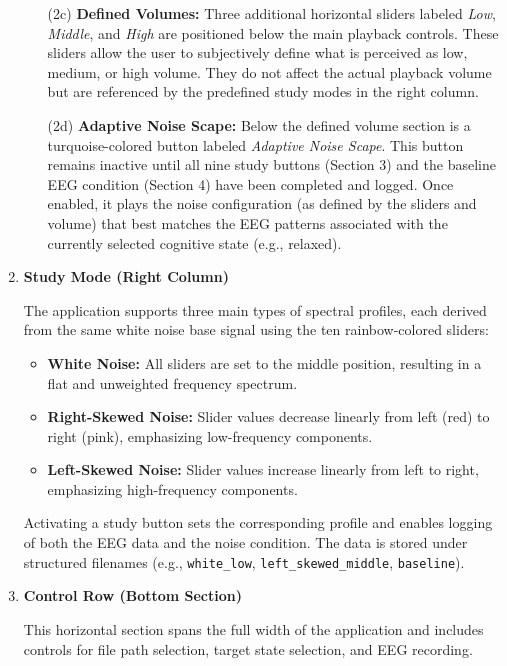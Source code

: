 \begin{enumerate}
\begin{enumerate}
  \item[(2c)] \textbf{Defined Volumes:} Three additional horizontal sliders labeled \textit{Low}, \textit{Middle}, and \textit{High} are positioned below the main playback controls. These sliders allow the user to subjectively define what is perceived as low, medium, or high volume. They do not affect the actual playback volume but are referenced by the predefined study modes in the right column.

  \item[(2d)] \textbf{Adaptive Noise Scape:} Below the defined volume section is a turquoise-colored button labeled \textit{Adaptive Noise Scape}. This button remains inactive until all nine study buttons (Section 3) and the baseline EEG condition (Section 4) have been completed and logged. Once enabled, it plays the noise configuration (as defined by the sliders and volume) that best matches the EEG patterns associated with the currently selected cognitive state (e.g., relaxed). \\
\end{enumerate}

\item \textbf{Study Mode (Right Column)}

The application supports three main types of spectral profiles, each derived from the same white noise base signal using the ten rainbow-colored sliders:

\begin{itemize}
\item \textbf{White Noise:} All sliders are set to the middle position, resulting in a flat and unweighted frequency spectrum.
\item \textbf{Right-Skewed Noise:} Slider values decrease linearly from left (red) to right (pink), emphasizing low-frequency components.
\item \textbf{Left-Skewed Noise:} Slider values increase linearly from left to right, emphasizing high-frequency components.
\end{itemize}

Activating a study button sets the corresponding profile and enables logging of both the EEG data and the noise condition. The data is stored under structured filenames (e.g., \texttt{white\_low}, \texttt{left\_skewed\_middle}, \texttt{baseline}). \\

\item \textbf{Control Row (Bottom Section)}

This horizontal section spans the full width of the application and includes controls for file path selection, target state selection, and EEG recording.


\end{enumerate}
